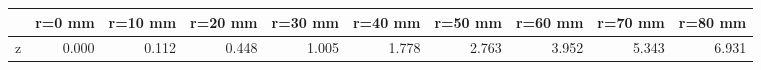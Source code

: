 \documentclass[convert={convertexe={magick.exe}}]{standalone}
\begin{document}
\begin{tabular}{lrrrrrrrrr}
\toprule
{} &  r=0 mm &  r=10 mm &  r=20 mm &  r=30 mm &  r=40 mm &  r=50 mm &  r=60 mm &  r=70 mm &  r=80 mm \\
\midrule
z &   0.000 &    0.112 &    0.448 &    1.005 &    1.778 &    2.763 &    3.952 &    5.343 &    6.931 \\
\bottomrule
\end{tabular}
\end{document}
